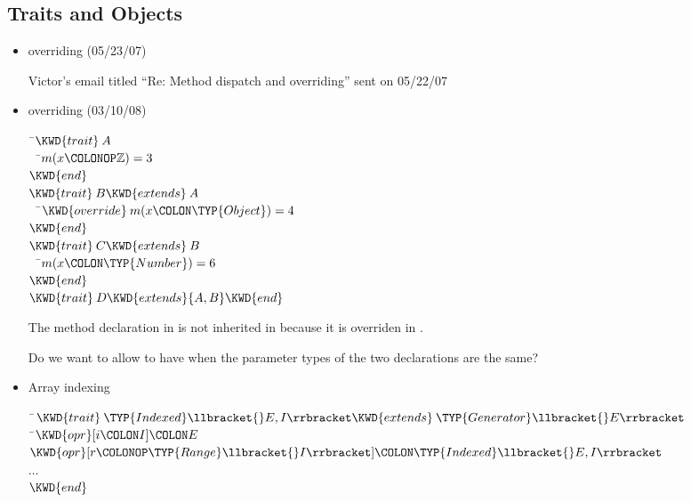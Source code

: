 \subsection{Traits and Objects}
 \begin{itemize}
\item overriding (05/23/07)

Victor's email titled ``Re: Method dispatch and overriding'' sent on 05/22/07

\item overriding (03/10/08)

\begin{Fortress}
{\tt~}\pushtabs\=\+\( \KWD{trait}\:A\)\\
{\tt~~}\pushtabs\=\+\(   m(x\COLONOP\mathbb{Z}) = 3\)\-\\\poptabs
\( \KWD{end}\)\\
\( \KWD{trait}\:B \KWD{extends}\:A\)\\
{\tt~~}\pushtabs\=\+\(   \KWD{override}\:m(x\COLON \TYP{Object}) = 4\)\-\\\poptabs
\( \KWD{end}\)\\
\( \KWD{trait}\:C \KWD{extends}\:B\)\\
{\tt~~}\pushtabs\=\+\(   m(x\COLON \TYP{Number}) = 6\)\-\\\poptabs
\( \KWD{end}\)\\
\( \KWD{trait}\:D \KWD{extends} \{A, B\} \KWD{end}\)\-\\\poptabs
\end{Fortress}

The method declaration in  is not inherited in  because it is overriden in
.

Do we want to allow to have  when the parameter types of the two declarations are the same?

\item Array indexing
\begin{Fortress}
{\tt~}\pushtabs\=\+\( \KWD{trait}\:\TYP{Indexed}\llbracket{}E, I\rrbracket \KWD{extends}\:\TYP{Generator}\llbracket{}E\rrbracket\)\\
{\tt~}\pushtabs\=\+\(  \KWD{opr}[i\COLON I]\COLON E\)\\
\(  \KWD{opr}[r\COLONOP\TYP{Range}\llbracket{}I\rrbracket]\COLON \TYP{Indexed}\llbracket{}E, I\rrbracket\)\\
\(  \ldots\)\-\\\poptabs
\( \KWD{end}\)\-\\\poptabs
\end{Fortress}


\end{itemize}

